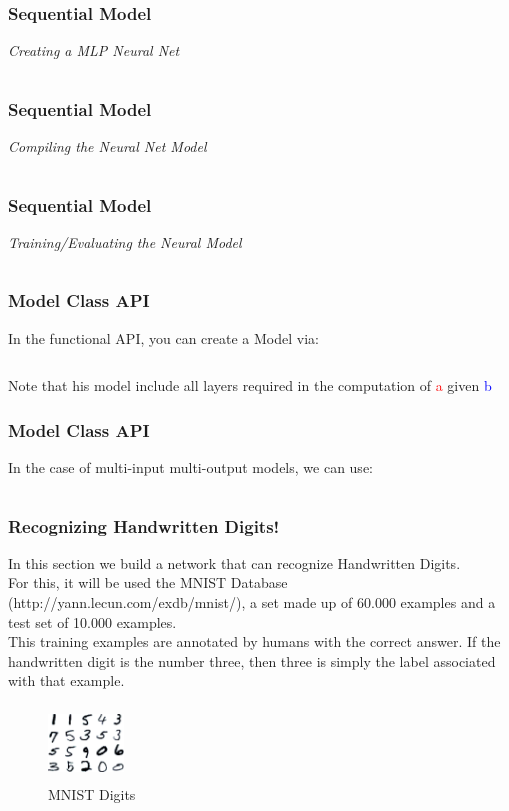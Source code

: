 \documentclass[aspectratio=169]{beamer}
\begin{document}
\begin{frame}
\frametitle{Sequential Model}
\textit{Creating a MLP Neural Net}
\inputminted{python}{./aux_files/ten.py}
\end{frame}

\begin{frame}
\frametitle{Sequential Model}
\textit{Compiling the Neural Net Model}
\inputminted{python}{./aux_files/eleven.py}
\end{frame}

\begin{frame}
\frametitle{Sequential Model}
\textit{Training/Evaluating the Neural Model}
\inputminted{python}{./aux_files/twelve.py}
\end{frame}

\begin{frame}
\frametitle{Model Class API}
In the functional API, you can create a Model via:
\\[0.2cm]
\inputminted{python}{./aux_files/thirteen.py}
Note that his model include all layers required in the computation of \textcolor{red}{a} given \textcolor{blue}{b}
\end{frame}

\begin{frame}
\frametitle{Model Class API}
In the case of multi-input multi-output models, we can use:
\\[0.2cm]
\inputminted{python}{./aux_files/fourteen.py}
\end{frame}

\begin{frame}
\frametitle{Recognizing Handwritten Digits!}
In this section we build a network that can recognize Handwritten Digits.
\\[0.3cm]
For this, it will be used the MNIST Database (http://yann.lecun.com/exdb/mnist/), a set made up of 60.000 examples and a test set of 10.000 examples.
\\[0.3cm]
This training examples are annotated by humans with the correct answer. If the handwritten digit is the number three, then three is simply the label associated with that example.
\begin{figure}
\includegraphics[width=2cm,height=2cm]{./aux_files/one.jpg}
\caption{MNIST Digits}
\label{fig:MNIST Digits}
\end{figure}
\end{frame}
\end{document}
